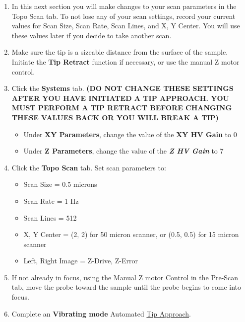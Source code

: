 \documentclass{../lab}
\begin{document}
\begin{enumerate}
    \item In this next section you will make changes to your scan parameters in the Topo Scan tab.  To not lose any of your scan settings, record your current values for Scan Size, Scan Rate, Scan Lines, and X, Y Center.  You will use these values later if you decide to take another scan.

    \item Make sure the tip is a sizeable distance from the surface of the sample.  Initiate the \textbf{Tip Retract }function if necessary, or use the manual Z motor control.

    \item Click the \textbf{Systems} tab. \textbf{(DO NOT CHANGE THESE SETTINGS AFTER YOU HAVE INITIATED A TIP APPROACH.  YOU MUST PERFORM A TIP RETRACT BEFORE CHANGING THESE VALUES BACK OR YOU WILL \hyperref[subsec:BrokenTip]{BREAK A TIP})}
    \begin{itemize}
        \item Under \textbf{XY Parameters}, change the value of the \textbf{XY HV Gain} to 0

        \item Under \textbf{Z Parameters}, change the value of the \emph{\textbf{Z HV Gain}} to 7
    \end{itemize}

    \item Click the \textbf{Topo Scan} tab.  Set scan parameters to:
    \begin{itemize}
        \item Scan Size = 0.5 microns

        \item Scan Rate = 1 Hz

        \item Scan Lines = 512

        \item X, Y Center = (2, 2) for 50 micron scanner, or (0.5, 0.5) for 15 micron scanner

        \item Left, Right Image = Z-Drive, Z-Error
    \end{itemize}

    \item If not already in focus, using the Manual Z motor Control in the Pre-Scan tab, move the probe toward the sample until the probe begins to come into focus.

    \item Complete an \textbf{Vibrating mode} Automated \hyperref[subsec:TipApproach]{Tip Approach}.


\end{enumerate}
\end{document}
